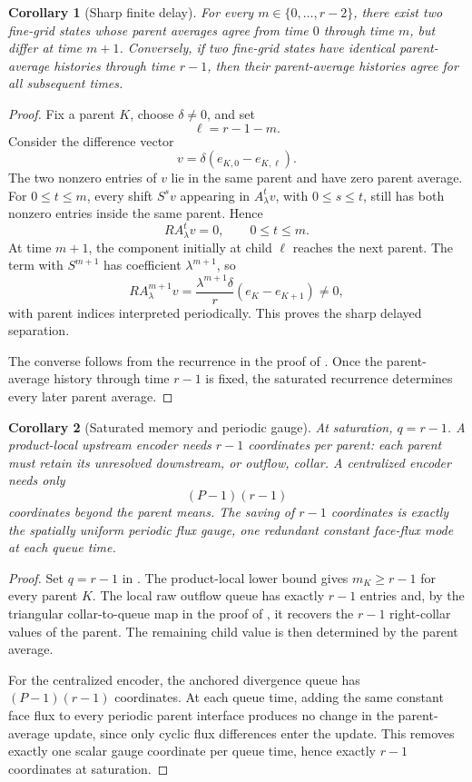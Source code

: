 \documentclass[pdflatex,sn-mathphys-num]{sn-jnl}%
\newtheorem{corollary}{Corollary}
\theoremstyle{thmstyleone}%
\theoremstyle{thmstyletwo}%
\theoremstyle{thmstylethree}%
\begin{document}
\begin{corollary}[Sharp finite delay]
\label{cor:sharp-delay}
For every \(m\in\{0,\ldots,r-2\}\), there exist two fine-grid states whose
parent averages agree from time \(0\) through time \(m\), but differ at time
\(m+1\).  Conversely, if two fine-grid states have identical parent-average
histories through time \(r-1\), then their parent-average histories agree for
all subsequent times.
\end{corollary}

\begin{proof}
Fix a parent \(K\), choose \(\delta\ne0\), and set
\[
  \ell=r-1-m.
\]
Consider the difference vector
\[
  v=\delta(e_{K,0}-e_{K,\ell}).
\]
The two nonzero entries of \(v\) lie in the same parent and have zero parent
average.  For \(0\le t\le m\), every shift \(S^s v\) appearing in
\(A_\lambda^t v\), with \(0\le s\le t\), still has both nonzero entries
inside the same parent.  Hence
\[
  RA_\lambda^t v=0,
  \qquad
  0\le t\le m.
\]
At time \(m+1\), the component initially at child \(\ell\) reaches the next
parent.  The term with \(S^{m+1}\) has coefficient \(\lambda^{m+1}\), so
\[
  RA_\lambda^{m+1}v
  =
  \frac{\lambda^{m+1}\delta}{r}
  (e_K-e_{K+1})
  \ne0,
\]
with parent indices interpreted periodically.  This proves the sharp delayed
separation.

The converse follows from the recurrence in the proof of .
Once the parent-average history through time \(r-1\) is fixed, the saturated
recurrence determines every later parent average.
\end{proof}

\begin{corollary}[Saturated memory and periodic gauge]
\label{cor:gauge}
At saturation, \(q=r-1\).  A product-local upstream encoder needs \(r-1\)
coordinates per parent: each parent must retain its unresolved downstream,
or outflow, collar.  A centralized encoder needs only
\[
  (P-1)(r-1)
\]
coordinates beyond the parent means.  The saving of \(r-1\) coordinates is
exactly the spatially uniform periodic flux gauge, one redundant constant
face-flux mode at each queue time.
\end{corollary}

\begin{proof}
Set \(q=r-1\) in .  The product-local lower bound gives
\(m_K\ge r-1\) for every parent \(K\).  The local raw outflow queue has
exactly \(r-1\) entries and, by the triangular collar-to-queue map in the
proof of , it recovers the \(r-1\) right-collar values of the
parent.  The remaining child value is then determined by the parent average.

For the centralized encoder, the anchored divergence queue has
\((P-1)(r-1)\) coordinates.  At each queue time, adding the same constant
face flux to every periodic parent interface produces no change in the
parent-average update, since only cyclic flux differences enter the update.
This removes exactly one scalar gauge coordinate per queue time, hence
exactly \(r-1\) coordinates at saturation.
\end{proof}
\end{document}
